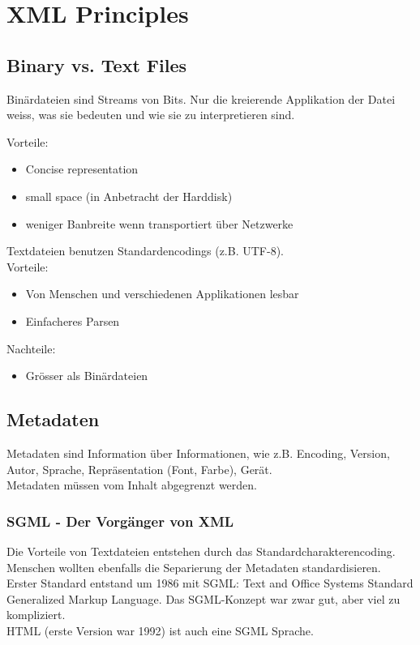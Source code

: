 \chapter{XML Principles}
\section{Binary vs. Text Files}
Binärdateien sind Streams von Bits. Nur die kreierende Applikation der Datei weiss, was sie bedeuten und wie sie zu interpretieren sind.

Vorteile:\\
\begin{itemize}
\item Concise representation
\item small space (in Anbetracht der Harddisk)
\item weniger Banbreite wenn transportiert über Netzwerke
\end{itemize}

Textdateien benutzen Standardencodings (z.B. UTF-8).\\

Vorteile:
\begin{itemize}
\item Von Menschen und verschiedenen Applikationen lesbar
\item Einfacheres Parsen
\end{itemize}
Nachteile:
\begin{itemize}
\item Grösser als Binärdateien
\end{itemize}

\section{Metadaten}
Metadaten sind Information über Informationen, wie z.B. Encoding, Version, Autor, Sprache, Repräsentation (Font, Farbe), Gerät.\\
Metadaten müssen vom Inhalt abgegrenzt werden.

\subsection{SGML - Der Vorgänger von XML}

Die Vorteile von Textdateien entstehen durch das Standardcharakterencoding.\\
Menschen wollten ebenfalls die Separierung der Metadaten standardisieren.\\
Erster Standard entstand um 1986 mit SGML: Text and Office Systems Standard Generalized Markup Language. Das SGML-Konzept war zwar gut, aber viel zu kompliziert.\\
HTML (erste Version war 1992) ist auch eine SGML Sprache.

